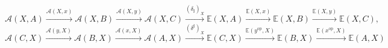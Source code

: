 \documentclass[preview]{standalone}
\begin{document}
\begin{center}
$$\mathscr{A}(X,A) \xrightarrow{\mathscr{A}(X,x)} \mathscr{A}(X,B) \xrightarrow{\mathscr{A}(X,y)} \mathscr{A}(X,C) \xrightarrow{(\delta_\sharp)_X} \mathbb{E}(X,A) \xrightarrow{\mathbb{E}(X,x)} \mathbb{E}(X,B) \xrightarrow{\mathbb{E}(X,y)} \mathbb{E}(X,C),$$$$\mathscr{A}(C,X) \xrightarrow{\mathscr{A}(y,X)} \mathscr{A}(B,X) \xrightarrow{\mathscr{A}(x,X)} \mathscr{A}(A,X) \xrightarrow{(\delta^\sharp)_X} \mathbb{E}(C,X) \xrightarrow{\mathbb{E}(y^\text{op},X)} \mathbb{E}(B,X) \xrightarrow{\mathbb{E}(x^\text{op},X)} \mathbb{E}(A,X)$$
\end{center}
\end{document}
